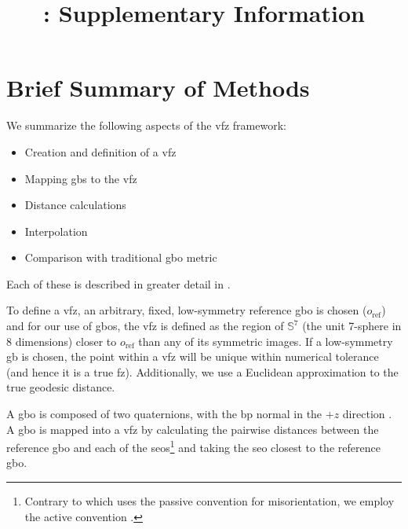 \documentclass[preprint,12pt]{elsarticle}
\begin{document}
	\sloppy %
	
	\begin{frontmatter}
		
		\title{\mytitletwo{}: Supplementary Information}
		
		
		
	\end{frontmatter}
	
\tableofcontents

\section{Brief Summary of  Methods}
    \label{sec:supp:vfz-summary}

    We summarize the following aspects of the \gls{vfz} framework:
    \begin{itemize}
        \item Creation and definition of a \gls{vfz}
        \item Mapping \glspl{gb} to the \gls{vfz}
        \item Distance calculations
        \item Interpolation
        \item Comparison with traditional \gls{gbo} metric
    \end{itemize}
    Each of these is described in greater detail in \citet{bairdFiveDegreeofFreedomPropertyUnderReview}.
    
    To define a \gls{vfz}, an arbitrary, fixed, low-symmetry reference \gls{gbo} is chosen ($o_{\text{ref}}$) and for our use of \glspl{gbo}, the \gls{vfz} is defined as the region of $\mathbb{S}^7$ (the unit 7-sphere in 8 dimensions) closer to $o_{\text{ref}}$ than any of its symmetric images. If a low-symmetry \gls{gb} is chosen, the point within a \gls{vfz} will be unique within numerical tolerance (and hence it is a true \gls{fz}). Additionally, we use a Euclidean approximation to the true geodesic distance.
    
    
    A \gls{gbo} is composed of two quaternions, with the \gls{bp} normal in the $+z$ direction \cite{francisGeodesicOctonionMetric2019}. A \gls{gbo} is mapped into a \gls{vfz} by calculating the pairwise distances between the reference \gls{gbo} and each of the \glspl{seo}\footnote{Contrary to \citet{francisGeodesicOctonionMetric2019} which uses the passive convention for misorientation, we employ the active convention \cite{bairdFiveDegreeofFreedomPropertyUnderReview}. } and taking the \gls{seo} closest to the reference \gls{gbo}.
    
\end{document}
